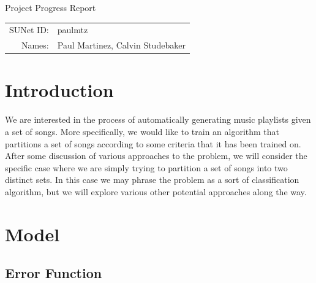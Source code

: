 \documentclass[12pt]{article}
\begin{document}
\begin{center}
{\Large Project Progress Report}

\begin{tabular}{rl}
SUNet ID: & paulmtz \\
Names: & Paul Martinez, Calvin Studebaker \\
\end{tabular}
\end{center}

\section*{Introduction}

We are interested in the process of automatically generating music playlists given a set of songs. More specifically, we would like to train an algorithm that partitions a set of songs according to some criteria that it has been trained on. After some discussion of various approaches to the problem, we will consider the specific case where we are simply trying to partition a set of songs into two distinct sets. In this case we may phrase the problem as a sort of classification algorithm, but we will explore various other potential approaches along the way.

\section*{Model}

\subsection*{Error Function}
\end{document}
